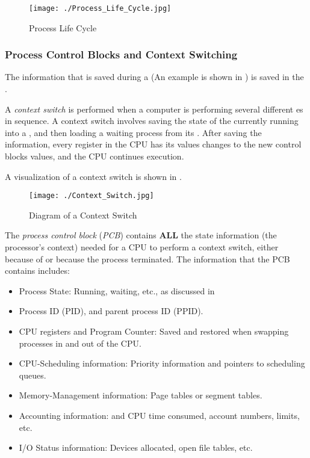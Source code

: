\begin{figure}[h!tbp]
  \centering
  \texttt{[image: ./Process\_Life\_Cycle.jpg]}
  \caption{Process Life Cycle}
  \label{fig:Process_Life_Cycle}
\end{figure}

\subsubsection{Process Control Blocks and Context Switching}\label{subsubsec:PCBs_Context_Switching}
The information that is saved during a  (An example is shown in ) is saved in the .

\begin{definition}\label{def:Context_Switch}
  A \emph{context switch} is performed when a computer is performing several different es in sequence.
  A context switch involves saving the state of the currently running  into a , and then loading a waiting process from its .
  After saving the information, every register in the CPU has its values changes to the new control blocks values, and the CPU continues execution.

  A visualization of a context switch is shown in .
\end{definition}

\begin{figure}[h!tbp]
  \centering
  \texttt{[image: ./Context\_Switch.jpg]}
  \caption{Diagram of a Context Switch}
  \label{fig:Context_Switch}
\end{figure}

\begin{definition}\label{def:Process_Control_Block}
  The \emph{process control block} (\emph{PCB}) contains \textbf{ALL} the state information (the processor's context) needed for a CPU to perform a context switch, either because of  or because the process terminated.
  The information that the PCB contains includes:
  \begin{itemize}[noitemsep]
  \item Process State: Running, waiting, etc., as discussed in 
  \item Process ID (PID), and parent process ID (PPID).\@
  \item CPU registers and Program Counter: Saved and restored when swapping processes in and out of the CPU.\@
  \item CPU-Scheduling information: Priority information and pointers to scheduling queues.
  \item Memory-Management information: Page tables or segment tables.
  \item Accounting information:  and  CPU time consumed, account numbers, limits, etc.
  \item I/O Status information: Devices allocated, open file tables, etc.
  \end{itemize}
\end{definition}

